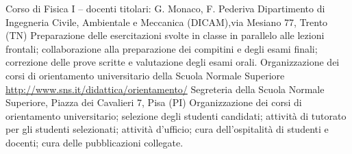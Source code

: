 \documentclass[helvetica,italian,logo,notitle,totpages,utf8]{europecv2013}
\begin{document}
\begin{europecv}

{Corso di Fisica I -- docenti titolari: G. Monaco, F. Pederiva}%
{Dipartimento di Ingegneria Civile, Ambientale e Meccanica (DICAM),\newline via Mesiano 77, Trento (TN)}%
{Preparazione delle esercitazioni svolte in classe in parallelo alle lezioni frontali; collaborazione alla preparazione dei compitini e degli esami finali; correzione delle prove scritte e valutazione degli esami orali.}%
{Organizzazione dei corsi di orientamento universitario della Scuola Normale Superiore \newline \url{http://www.sns.it/didattica/orientamento/}}%
{Segreteria della Scuola Normale Superiore, Piazza dei Cavalieri 7, Pisa (PI)}%
{Organizzazione dei corsi di orientamento universitario; selezione degli studenti candidati; attività di tutorato per gli studenti selezionati; attività d'ufficio; cura dell'ospitalità di studenti e docenti; cura delle pubblicazioni collegate.}%




%
%
%
%
%

\end{europecv}
\end{document}
